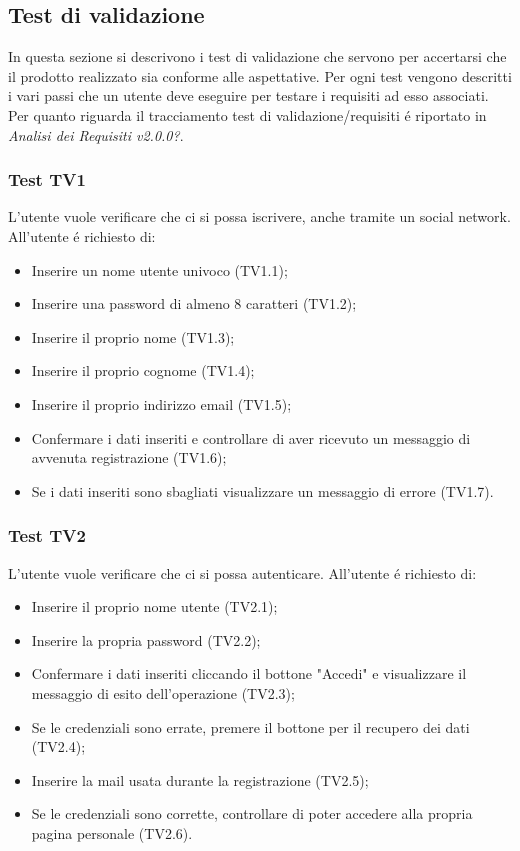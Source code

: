 \subsection{Test di validazione}
In questa sezione si descrivono i test di validazione che servono per accertarsi che il prodotto realizzato sia conforme alle aspettative.
Per ogni test vengono descritti i vari passi che un utente deve eseguire per testare i requisiti ad esso associati. Per quanto riguarda il tracciamento test di validazione/requisiti é riportato in \textit{Analisi dei Requisiti v2.0.0?}.

\subsubsection{Test TV1}
L'utente vuole verificare che ci si possa iscrivere, anche tramite un social network. \newline
All'utente é richiesto di:
\begin{itemize}
	\item Inserire un nome utente univoco (TV1.1);
	\item Inserire una password di almeno 8 caratteri (TV1.2);
	\item Inserire il proprio nome (TV1.3);
	\item Inserire il proprio cognome (TV1.4);
	\item Inserire il proprio indirizzo email (TV1.5);
	\item Confermare i dati inseriti e controllare di aver ricevuto un messaggio di avvenuta registrazione (TV1.6);
	\item Se i dati inseriti sono sbagliati visualizzare un messaggio di errore (TV1.7).
\end{itemize}

\subsubsection{Test TV2}
L'utente vuole verificare che ci si possa autenticare. \newline
All'utente é richiesto di:
\begin{itemize}
	\item Inserire il proprio nome utente (TV2.1);
	\item Inserire la propria password (TV2.2);
	\item Confermare i dati inseriti cliccando il bottone "Accedi" e visualizzare il messaggio di esito dell'operazione (TV2.3);
	\item Se le credenziali sono errate, premere il bottone per il recupero dei dati (TV2.4);
	\item Inserire la mail usata durante la registrazione (TV2.5);
	\item Se le credenziali sono corrette, controllare di poter accedere alla propria pagina personale (TV2.6).
\end{itemize}

